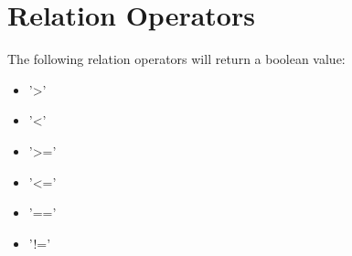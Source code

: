 \section{Relation Operators}
The following relation operators will return a boolean value:
\begin{itemize}
	\item '>'
	\item '<'
	\item '>='
	\item '<='
	\item '=='
	\item '!='
\end{itemize}
